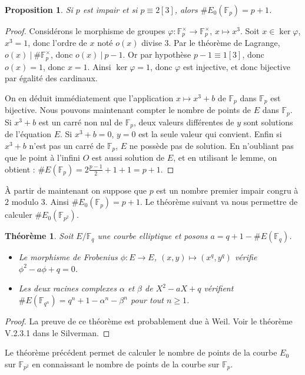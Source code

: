 \documentclass{article}
\newtheorem{thm}{Théorème}
\newtheorem{prop}{Proposition}
\newcommand{\Fp}{\mathbb{F}_{p}}
\newcommand{\Fq}{\mathbb{F}_{p^2}}
\newcommand{\F}{\mathbb{F}}
\begin{document}
\begin{prop}
  Si $p$ est impair et si $p \equiv 2 [3]$, alors $\#E_0(\Fp) = p+1$.
\end{prop}

\begin{proof}
  Considérons le morphisme de groupes $\varphi \colon \Fp^\times \to \Fp^\times$, $x \mapsto x^3$. 
  Soit $x\in \ker \varphi$, $x^3 = 1$, donc l'ordre de $x$ noté $o(x)$ divise $3$. 
  Par le théorème de Lagrange, $o(x)\ |\ \#\Fp^\times$, donc $o(x)\ |\ p-1$. 
  Or par hypothèse $p-1\equiv 1[3]$, donc $o(x) = 1$, donc $x = 1$.
  Ainsi $\ker \varphi = {1}$, donc $\varphi$ est injective, et donc bijective par égalité des cardinaux.

  On en déduit immédiatement que l'application $x \mapsto x^3 + b$ de $\Fp$ dans $\Fp$ est bijective.
  Nous pouvons maintenant compter le nombre de points de $E$ dans $\Fp$. 
  Si $x^3 + b$ est un carré non nul de $\Fp$, deux valeurs différentes de $y$ sont solutions de l'équation $E$. 
  Si $x^3 + b = 0$, $y = 0$ est la seule valeur qui convient.
  Enfin si $x^3 + b$ n'est pas un carré de $\Fp$, $E$ ne possède pas de solution.
  En n'oubliant pas que le point à l'infini $O$ est aussi solution de $E$, et en utilisant le lemme, on obtient : $\#E(\Fp) = 2\frac{p-1}{2} + 1 + 1 = p+1$.
\end{proof}

À partir de maintenant on suppose que $p$ est un nombre premier impair congru à $2$ modulo $3$. Ainsi $\#E_0(\Fp) = p+1$. Le théorème suivant va nous permettre de calculer $\#E_0(\F_{p^2})$. 

\begin{thm}
  Soit $E/\F_q$ une courbe elliptique et posons $a = q + 1 - \#E(\F_q)$.
  \begin{itemize}
    \item Le morphisme de Frobenius $\phi \colon E \to E$, $(x, y) \mapsto (x^q, y^q)$ vérifie $\phi^2 - a\phi + q = 0$.
    \item Les deux racines complexes $\alpha$ et $\beta$ de $X^2 - aX + q$ vérifient $\#E(\F_{q^n}) = q^n + 1 - \alpha^n - \beta^n$ pour tout $n\ge1$. 
  \end{itemize}
\end{thm}

\begin{proof}
  La preuve de ce théorème est probablement due à Weil. Voir le théorème V.2.3.1 dans le Silverman.
\end{proof}

Le théorème précédent permet de calculer le nombre de points de la courbe $E_0$ sur $\Fq$ en connaissant le nombre de points de la courbe sur $\Fp$.
\end{document}
